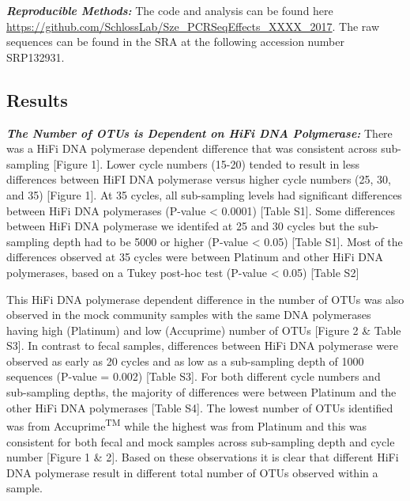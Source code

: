 \documentclass[12pt,]{article}
\begin{document}
\textbf{\emph{Reproducible Methods:}} The code and analysis can be found
here \url{https://github.com/SchlossLab/Sze_PCRSeqEffects_XXXX_2017}.
The raw sequences can be found in the SRA at the following accession
number SRP132931.

\newpage

\subsection{Results}\label{results}

\textbf{\emph{The Number of OTUs is Dependent on HiFi DNA Polymerase:}}
There was a HiFi DNA polymerase dependent difference that was consistent
across sub-sampling {[}Figure 1{]}. Lower cycle numbers (15-20) tended
to result in less differences between HiFI DNA polymerase versus higher
cycle numbers (25, 30, and 35) {[}Figure 1{]}. At 35 cycles, all
sub-sampling levels had significant differences between HiFi DNA
polymerases (P-value \textless{} 0.0001) {[}Table S1{]}. Some
differences between HiFi DNA polymerase we identifed at 25 and 30 cycles
but the sub-sampling depth had to be 5000 or higher (P-value \textless{}
0.05) {[}Table S1{]}. Most of the differences observed at 35 cycles were
between Platinum and other HiFi DNA polymerases, based on a Tukey
post-hoc test (P-value \textless{} 0.05) {[}Table S2{]}

This HiFi DNA polymerase dependent difference in the number of OTUs was
also observed in the mock community samples with the same DNA
polymerases having high (Platinum) and low (Accuprime) number of OTUs
{[}Figure 2 \& Table S3{]}. In contrast to fecal samples, differences
between HiFi DNA polymerase were observed as early as 20 cycles and as
low as a sub-sampling depth of 1000 sequences (P-value = 0.002) {[}Table
S3{]}. For both different cycle numbers and sub-sampling depths, the
majority of differences were between Platinum and the other HiFi DNA
polymerases {[}Table S4{]}. The lowest number of OTUs identified was
from Accuprime\textsuperscript{TM} while the highest was from Platinum
and this was consistent for both fecal and mock samples across
sub-sampling depth and cycle number {[}Figure 1 \& 2{]}. Based on these
observations it is clear that different HiFi DNA polymerase result in
different total number of OTUs observed within a sample.
\end{document}
